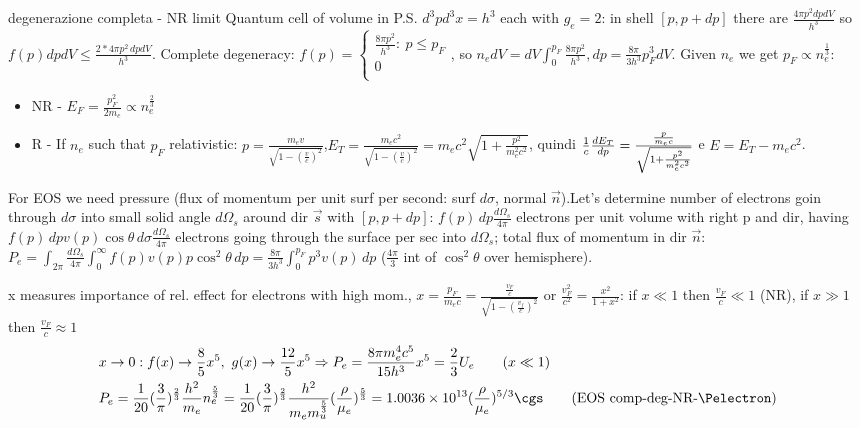 \begin{frame}{degenerazione completa - NR limit}
    Quantum cell of volume in P.S. $d^3pd^3x=h^3$ each with $g_e=2$: in shell $[p,p+dp]$ there are $\frac{4\pi p^2dpdV}{h^3}$ so $f(p)dpdV\leq \frac{2*4\pi p^2\,dpdV}{h^3}$. Complete degeneracy: $f(p)=\left\{\begin{array}{l}
            \frac{8\pi p^2}{h^3}:\ p\leq p_F\\
            0\\
    \end{array}\right.$, so $n_edV=dV\int_0^{p_F}\frac{8\pi p^2}{h^3},dp=\frac{8\pi}{3h^3}p_F^3dV$. Given $n_e$ we get $p_F\propto n_e^{\frac{1}{3}}$:
    \begin{itemize}
            \item NR - $E_F=\frac{p_F^2}{2m_e}\propto n_e^{\frac{2}{3}}$
            \item R - If $n_e$ such that $p_F$ relativistic: $p=\frac{m_ev}{\sqrt{1-(\frac{v}{c})^2}}$,$E_T=\frac{m_ec^2}{\sqrt{1-(\frac{v}{c})^2}}=m_ec^2\sqrt{1+\frac{p^2}{m_e^2c^2}}$, quindi $\frac{1}{c}\TDy{p}{E_T}=\frac{\frac{p}{m_ec}}{\sqrt{1+\frac{p^2}{m_e^2c^2}}}$ e $E=E_T-m_ec^2$.
        \end{itemize}
    For EOS we need pressure (flux of momentum per unit surf per second: surf $d\sigma$, normal $\vec{n}$).Let's determine number of electrons goin through $d\sigma$ into small solid angle $d\Omega_s$ around dir $\vec{s}$ with $[p,p+dp]$: $f(p)\,dp \frac{d\Omega_s}{4\pi}$ electrons per unit volume with right p and dir, having $f(p)\,dpv(p)\cos{\theta}\,d\sigma \frac{d\Omega_s}{4\pi}$ electrons going through the surface per sec into $d\Omega_s$; total flux of momentum in dir $\vec{n}$: $P_e=\int_{2\pi}\frac{d\Omega_s}{4\pi}\int_0^{\infty}f(p)v(p)p\cos^2{\theta}\,dp=\frac{8\pi}{3h^3}\int_0^{p_F}p^3v(p)\,dp$ ($\frac{4\pi}{3}$ int of $\cos^2{\theta}$ over hemisphere).

x measures importance of rel. effect for electrons with high mom., $x=\frac{p_F}{m_ec}=\frac{\frac{v_F}{c}}{\sqrt{1-(\frac{v_f}{c})^2}}$ or $\frac{v_F^2}{c^2}=\frac{x^2}{1+x^2}$: if $x\ll1$ then $\frac{v_F}{c}\ll1$ (NR), if $x\gg1$ then $\frac{v_F}{c}\approx1$
\begin{align*}
    &x\to0: f(x)\to \frac{8}{5}x^5,\ g(x)\to \frac{12}{5}x^5\Rightarrow P_e=\frac{8\pi m_e^4c^5}{15h^3}x^5=\frac{2}{3}U_e\tag{$x\ll1$}\\
    &P_e=\frac{1}{20}(\frac{3}{\pi})^{\frac{2}{3}}\frac{h^2}{m_e}n_e^{\frac{5}{3}}=\frac{1}{20}(\frac{3}{\pi})^{\frac{2}{3}}\frac{h^2}{m_em_u^{\frac{5}{3}}}(\frac{\rho}{\mu_e})^{\frac{5}{3}}=\num{1.0036e13}(\frac{\rho}{\mu_e})\expy{5/3}\si{\cgs}\tag{EOS comp-deg-NR-\Pelectron}
\end{align*}
\end{frame}

